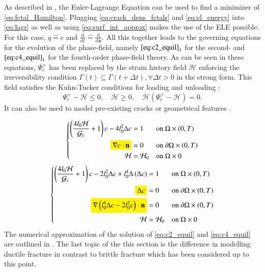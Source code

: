 As described in , the Euler-Lagrange Equation can be used to find a minimizer of \eqref{eq:fctal_Hamilton}. Plugging \eqref{eq:crack_dens_fctals} and \eqref{eq:el_energy} into \eqref{eq:lagr} as well as using \eqref{eq:surf_int_approx} makes the use of the ELE possible. For this case, $q\hat{=}c$ and $\frac{\mathrm{d}}{\mathrm{d}t}\hat{=}\frac{\mathrm{d}}{\mathrm{d}\mathbf{x}}$. All this together leads to the governing equations for the evolution of the phase-field, namely $\eqref{eq:c2_equil}_{1}$ for the second- and $\eqref{eq:c4_equil}_{1}$ for the fourth-order phase-field theory. As can be seen in these equations, $\Psi_{e}^{+}$ has been replaced by the strain history field $\mathcal{H}$ enforcing the irreversibility condition $\Gamma\left(t\right)\subseteq\Gamma\left(t+\Delta t\right), \forall \Delta t>0$ in the strong form. This field satisfies the Kuhn-Tucker conditions for loading and unloading \cite{01_PF_dyn_brittle}:
\begin{equation} \label{eq:KuhnTucker}
	\Psi_{e}^{+}-\mathcal{H}\leq0, \quad \dot{\mathcal{H}}\geq0, \quad \dot{\mathcal{H}}\left(\Psi_{e}^{+}-\mathcal{H}\right)=0.
\end{equation}
It can also be used to model pre-existing cracks or geometrical features \cite{01_PF_dyn_brittle}.

 \hl{}
\begin{equation} \label{eq:c2_equil}
		 \left\{\begin{alignedat}{2}
\left(\frac{4l_{0}\mathcal{H}}{\mathcal{G}_{c}}+1\right)c - 4l_{0}^{2}\Delta c &= 1 && \quad\text{on } \Omega\times\left(0,T\right) \\
\hl{\nabla c\cdot\mathbf{n}} &= 0 && \quad \text{on } \partial\Omega\times\left(0,T\right) \\
\mathcal{H} &= \mathcal{H}_{0} && \quad \text{on } \Omega\times0  
\end{alignedat}\right.
\end{equation}
\begin{equation} \label{eq:c4_equil}
		 \left\{\begin{alignedat}{2}
\left(\frac{4l_{0}\mathcal{H}}{\mathcal{G}_{c}}+1\right)c - 2l_{0}^{2}\Delta c + l_{0}^{4}\Delta\left(\Delta c\right) &= 1 && \quad\text{on } \Omega\times\left(0,T\right) \\
\hl{\Delta c} &= 0 && \quad \text{on } \partial\Omega\times\left(0,T\right) \\
\hl{\nabla\left(l_{0}^{4}\Delta c-2l_{0}^{2}c\right)\cdot\mathbf{n}} &= 0 && \quad \text{on } \partial\Omega\times\left(0,T\right) \\
\mathcal{H} &= \mathcal{H}_{0} && \quad \text{on } \Omega\times0  
\end{alignedat}\right.
\end{equation}
The numerical approximation of the solution of \eqref{eq:c2_equil} and \eqref{eq:c4_equil} are outlined in . The last topic of the this section is the difference in modelling ductile fracture in contrast to brittle fracture which has been considered up to this point.


